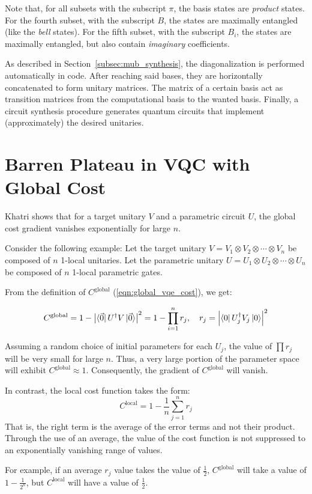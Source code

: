 \documentclass[a4paper,12pt]{article}
\begin{document}
Note that, for all subsets with the subscript $\pi$, the basis states are \emph{product} states.
For the fourth subset, with the subscript $B$, the states are maximally entangled (like the \emph{bell} states).
For the fifth subset, with the subscript $B_i$, the states are maximally entangled, but also contain \emph{imaginary} coefficients.

As described in Section~\ref{subsec:mub_synthesis}, the diagonalization is performed automatically in code.
After reaching said bases, they are horizontally concatenated to form unitary matrices.
The matrix of a certain basis act as transition matrices from the computational basis to the wanted basis.
Finally, a circuit synthesis procedure generates quantum circuits that implement (approximately) the desired unitaries.


\section{Barren Plateau in VQC with Global Cost} \label{app:vqc_global_bp}

Khatri \cite{khatri_quantum-assisted_2019} shows that for a target unitary $V$ and a parametric circuit $U$, the global cost gradient vanishes exponentially for large $n$.

Consider the following example:
Let the target unitary $V = V_1 \otimes V_2 \otimes \cdots \otimes V_n$ be composed of $n$ 1-local unitaries.
Let the parametric unitary $U = U_1 \otimes U_2 \otimes \cdots \otimes U_n$ be composed of $n$ 1-local parametric gates.

From the definition of $C^\textrm{global}$ (\ref{eqn:global_vqe_cost}), we get:

$$ C^{\textrm{global}} = 1 - \left|\bra{\vec{0}}U^\dagger V\ket{\vec{0}}\right|^2 = 1 - \prod_{i=1}^{n} r_j, \quad  r_j = \left| \bra{0} U_j^\dagger V_j \ket{0} \right|^2$$

Assuming a random choice of initial parameters for each $U_j$, the value of $\prod r_j$ will be very small for large $n$.
Thus, a very large portion of the parameter space will exhibit $C^\textrm{global} \approx 1$.
Consequently, the gradient of $C^\textrm{global}$ will vanish.

In contrast, the local cost function takes the form:
$$ C^\textrm{local} = 1 - \frac{1}{n} \sum_{j=1}^{n} r_j$$
That is, the right term is the average of the error terms and not their product.
Through the use of an average, the value of the cost function is not suppressed to an exponentially vanishing range of values.

For example, if an average $r_j$ value takes the value of $\frac{1}{2}$, $C^{\textrm{global}}$ will take a value of $1 - \frac{1}{2^n}$, but $C^\textrm{local}$ will have a value of $\frac{1}{2}$.
\end{document}
